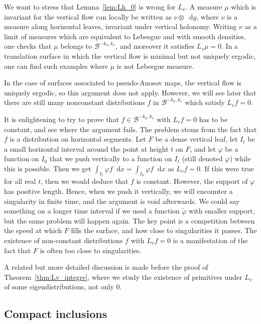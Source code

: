 \documentclass[11pt, a4paper, oneside, final, pagebackref]{amsart}
\newcommand{\boB}{\mathcal{B}}
\newcommand{\dd}{\mathop{}\!\mathrm{d}}
\renewcommand{\phi}{\varphi}
\theoremstyle{definition}
\numberwithin{equation}{section}
\begin{document}
We want to stress that Lemma~\ref{lem:Lh_0} is wrong for $L_v$. A measure
$\mu$ which is invariant for the vertical flow can locally be written as
$\nu\otimes \dd y$, where $\nu$ is a measure along horizontal leaves,
invariant under vertical holonomy. Writing $\nu$ as a limit of measures which
are equivalent to Lebesgue and with smooth densities, one checks that $\mu$
belongs to $\boB^{-k_h, k_v}$, and moreover it satisfies $L_v \mu=0$. In a
translation surface in which the vertical flow is minimal but not uniquely
ergodic, one can find such examples where $\mu$ is not Lebesgue measure.

In the case of surfaces associated to pseudo-Anosov maps, the vertical flow
is uniquely ergodic, so this argument does not apply. However, we will
see later that there are still many nonconstant distributions $f$ in
$\boB^{-k_h, k_v}$ which satisfy $L_v f = 0$.

It is enlightening to try to prove that $f\in \boB^{-k_h, k_v}$ with $L_v f =
0$ has to be constant, and see where the argument fails. The problem stems
from the fact that $f$ is a distribution on horizontal segments. Let $F$ be a
dense vertical leaf, let $I_t$ be a small horizontal interval around the
point at height $t$ on $F$, and let $\phi$ be a function on $I_0$ that we
push vertically to a function on $I_t$ (still denoted $\phi$) while this is
possible. Then we get $\int_{I_t} \phi f \dd x = \int_{I_0} \phi f \dd x$ as
$L_v f= 0$. If this were true for all real $t$, then we would deduce that $f$
is constant. However, the support of $\phi$ has positive length. Hence, when
we push it vertically, we will encounter a singularity in finite time, and
the argument is void afterwards. We could say something on a longer time
interval if we used a function $\tilde\phi$ with smaller support, but the
same problem will happen again. The key point is a competition between the
speed at which $F$ fills the surface, and how close to singularities it
passes. The existence of non-constant distributions $f$ with $L_v f = 0$ is a
manifestation of the fact that $F$ is often too close to singularities.

A related but more detailed discussion is made before the proof of
Theorem~\ref{thm:Lv_integre}, where we study the existence of primitives
under $L_v$ of some eigendistributions, not only $0$.

\subsection{Compact inclusions}
\end{document}

